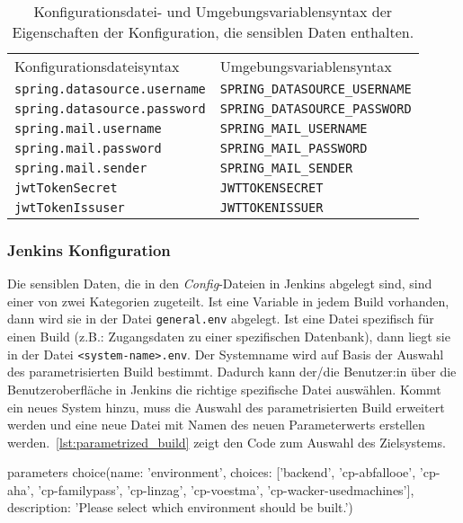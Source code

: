 \begin{table}[]
\caption{Konfigurationsdatei- und Umgebungsvariablensyntax der Eigenschaften der Konfiguration, die sensiblen Daten enthalten.}
\label{tab:env_variables}
\begin{tabular}{ll}
Konfigurationsdateisyntax           & Umgebungsvariablensyntax               \\
\texttt{spring.datasource.username} & \texttt{SPRING\_DATASOURCE\_USERNAME} \\
\texttt{spring.datasource.password} & \texttt{SPRING\_DATASOURCE\_PASSWORD} \\
\texttt{spring.mail.username}       & \texttt{SPRING\_MAIL\_USERNAME}       \\
\texttt{spring.mail.password}       & \texttt{SPRING\_MAIL\_PASSWORD}       \\
\texttt{spring.mail.sender}         & \texttt{SPRING\_MAIL\_SENDER}         \\
\texttt{jwtTokenSecret}             & \texttt{JWTTOKENSECRET}               \\
\texttt{jwtTokenIssuser}            & \texttt{JWTTOKENISSUER}
\end{tabular}
\end{table}

\subsubsection{Jenkins Konfiguration}

Die sensiblen Daten, die in den \textit{Config}-Dateien in Jenkins abgelegt sind, sind einer von zwei Kategorien zugeteilt. Ist eine Variable in jedem Build vorhanden, dann wird sie in der Datei \texttt{general.env} abgelegt. Ist eine Datei spezifisch für einen Build (z.B.: Zugangsdaten zu einer spezifischen Datenbank), dann liegt sie in der Datei \texttt{<system-name>.env}. Der Systemname wird auf Basis der Auswahl des parametrisierten Build bestimmt. Dadurch kann der/die Benutzer:in über die Benutzeroberfläche in Jenkins die richtige spezifische Datei auswählen. Kommt ein neues System hinzu, muss die Auswahl des parametrisierten Build erweitert werden und eine neue Datei mit Namen des neuen Parameterwerts erstellen werden.~\autoref{lst:parametrized_build} zeigt den Code zum Auswahl des Zielsystems.

\begin{Groovy}[numbers=none, caption={caption}, label={lst:parametrized_build}]
parameters {
    choice(name: 'environment', choices: ['backend', 'cp-abfallooe', 'cp-aha', 'cp-familypass', 'cp-linzag', 'cp-voestma', 'cp-wacker-usedmachines'], description: 'Please select which environment should be built.')
}
\end{Groovy}


